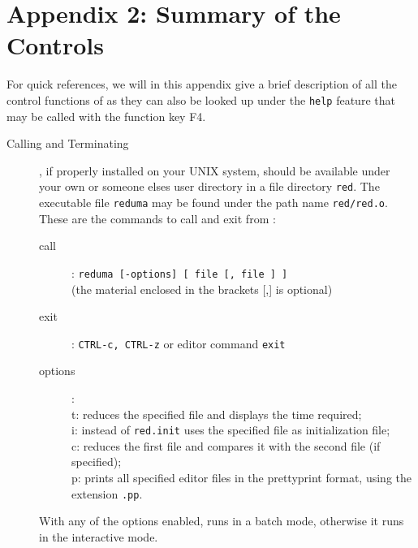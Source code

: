 \section*{Appendix 2: Summary of the \pired Controls}

For quick references, we will in this appendix give a brief 
description of all the control functions of \pired
as they can also be looked up under the {\tt help} 
feature that may be called with the function key F4. 
\\

\begin{description}

\item[Calling and Terminating \pired]$\;$\\
\pired, if properly installed on your UNIX system, should be available under your own or someone elses user directory
in a file directory {\tt red}. The executable file {\tt reduma} 
may be found under the path name {\tt red/red.o}. These are the commands to call and exit from \pired:
\begin{description}
\item[{\rm call}]: {\tt reduma [-options] [ file [, file ] ]}
\\ (the material enclosed in the brackets [,] is optional) 
\item[{\rm exit}]: {\tt CTRL-c, CTRL-z} or editor command {\tt exit}
\item[{\rm options}]:
\\ t: reduces the specified file and displays the time required; 
\\ i: instead of {\tt red.init} uses the specified file as initialization file;
\\ c: reduces the first file and compares it with the second file (if
 specified);   
\\ p: prints all specified editor files in the prettyprint format, using
the extension {\tt .pp}.
\end{description}

With any of the options enabled, \pired runs in a batch mode, 
otherwise it runs in the interactive mode.
\\


\end{description}
